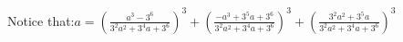 \documentclass[preview]{standalone}
\begin{document}
\begin{center}
Notice that:$a = \left( \frac{a^3 - 3^6}{3^2a^2 + 3^4a + 3^6} \right)^3 + \left( \frac{-a^3 + 3^5a + 3^6}{3^2a^2 + 3^4a + 3^6} \right)^3 + \left( \frac{3^2a^2 + 3^5a}{3^2a^2 + 3^4a + 3^6} \right)^3$
\end{center}
\end{document}
